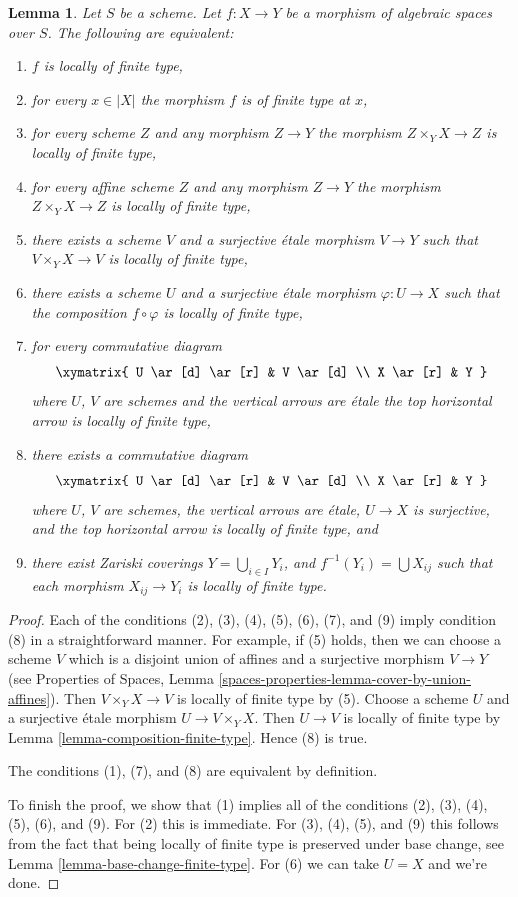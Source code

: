 \documentclass{stacks-project}
\theoremstyle{plain}
\newtheorem{lemma}[subsection]{Lemma}
\theoremstyle{definition}
\theoremstyle{remark}
\numberwithin{equation}{subsection}
\begin{document}
\begin{lemma}
\label{lemma-finite-type-local}
Let $S$ be a scheme.
Let $f : X \to Y$ be a morphism of algebraic spaces over $S$.
The following are equivalent:
\begin{enumerate}
\item $f$ is locally of finite type,
\item for every $x \in |X|$ the morphism $f$ is of finite type at $x$,
\item for every scheme $Z$ and any morphism $Z \to Y$ the morphism
$Z \times_Y X \to Z$ is locally of finite type,
\item for every affine scheme $Z$ and any morphism
$Z \to Y$ the morphism $Z \times_Y X \to Z$ is locally of finite type,
\item there exists a scheme $V$ and a surjective \'etale morphism
$V \to Y$ such that $V \times_Y X \to V$ is locally of finite type,
\item there exists a scheme $U$ and a surjective \'etale morphism
$\varphi : U \to X$ such that the composition $f \circ \varphi$
is locally of finite type,
\item for every commutative diagram
$$
\xymatrix{
U \ar[d] \ar[r] & V \ar[d] \\
X \ar[r] & Y
}
$$
where $U$, $V$ are schemes and the vertical arrows are \'etale
the top horizontal arrow is locally of finite type,
\item there exists a commutative diagram
$$
\xymatrix{
U \ar[d] \ar[r] & V \ar[d] \\
X \ar[r] & Y
}
$$
where $U$, $V$ are schemes, the vertical arrows are \'etale, $U \to X$
is surjective, and the top horizontal arrow is locally of finite type, and
\item there exist Zariski coverings $Y = \bigcup_{i \in I} Y_i$,
and $f^{-1}(Y_i) = \bigcup X_{ij}$ such that
each morphism $X_{ij} \to Y_i$ is locally of finite type.
\end{enumerate}
\end{lemma}

\begin{proof}
Each of the conditions (2), (3), (4), (5), (6), (7), and (9)
imply condition (8) in a straightforward manner. For example, if
(5) holds, then we can choose a scheme $V$ which is a disjoint
union of affines and a surjective morphism $V \to Y$
(see Properties of Spaces, Lemma
\ref{spaces-properties-lemma-cover-by-union-affines}).
Then $V \times_Y X \to V$ is locally of finite type by (5).
Choose a scheme $U$ and a surjective \'etale morphism
$U \to V \times_Y X$. Then $U \to V$ is locally of finite
type by Lemma \ref{lemma-composition-finite-type}.
Hence (8) is true.

\medskip\noindent
The conditions (1), (7), and (8) are equivalent by definition.

\medskip\noindent
To finish the proof, we show that (1) implies all of the conditions
(2), (3), (4), (5), (6), and (9). For (2) this is immediate.
For (3), (4), (5), and (9) this follows from the fact that being
locally of finite type is preserved under base change, see
Lemma \ref{lemma-base-change-finite-type}.
For (6) we can take $U = X$ and we're done.
\end{proof}
\end{document}
